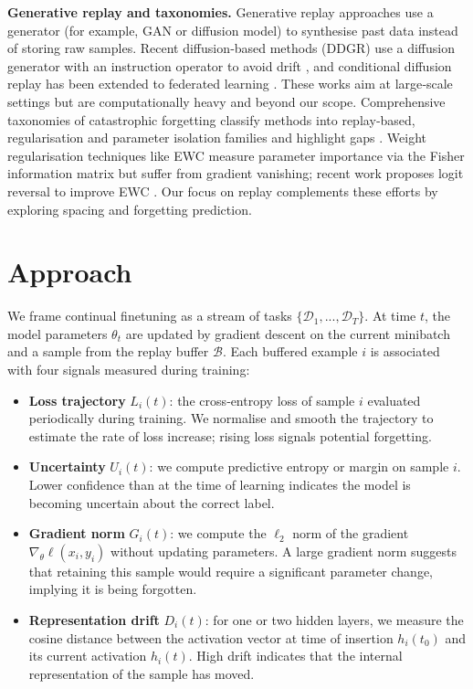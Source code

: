 \documentclass{article}
\begin{document}
\textbf{Generative replay and taxonomies.}  Generative replay approaches use a generator (for example, GAN or diffusion model) to synthesise past data instead of storing raw samples.  Recent diffusion\mbox{‑}based methods (DDGR) use a diffusion generator with an instruction operator to avoid drift \citep{gao2023ddgr}, and conditional diffusion replay has been extended to federated learning \citep{mei2024dcfl}.  These works aim at large\mbox{‑}scale settings but are computationally heavy and beyond our scope.  Comprehensive taxonomies of catastrophic forgetting classify methods into replay\mbox{‑}based, regularisation and parameter isolation families and highlight gaps \citep{aleixo2023taxonomy}.  Weight regularisation techniques like EWC measure parameter importance via the Fisher information matrix but suffer from gradient vanishing; recent work proposes logit reversal to improve EWC \citep{liu2026ewcdr}.  Our focus on replay complements these efforts by exploring spacing and forgetting prediction.

\section{Approach}

We frame continual finetuning as a stream of tasks $\{\mathcal{D}_1, ..., \mathcal{D}_T\}$.  At time $t$, the model parameters $\theta_t$ are updated by gradient descent on the current minibatch and a sample from the replay buffer $\mathcal{B}$.  Each buffered example $i$ is associated with four signals measured during training:

\begin{itemize}
    \item \textbf{Loss trajectory} $L_i(t)$: the cross\mbox{‑}entropy loss of sample $i$ evaluated periodically during training.  We normalise and smooth the trajectory to estimate the rate of loss increase; rising loss signals potential forgetting.
    \item \textbf{Uncertainty} $U_i(t)$: we compute predictive entropy or margin on sample $i$.  Lower confidence than at the time of learning indicates the model is becoming uncertain about the correct label.
    \item \textbf{Gradient norm} $G_i(t)$: we compute the $\ell_2$ norm of the gradient $\nabla_{\theta} \ell(x_i,y_i)$ without updating parameters.  A large gradient norm suggests that retaining this sample would require a significant parameter change, implying it is being forgotten.
    \item \textbf{Representation drift} $D_i(t)$: for one or two hidden layers, we measure the cosine distance between the activation vector at time of insertion $h_i(t_0)$ and its current activation $h_i(t)$.  High drift indicates that the internal representation of the sample has moved.
\end{itemize}
\end{document}
